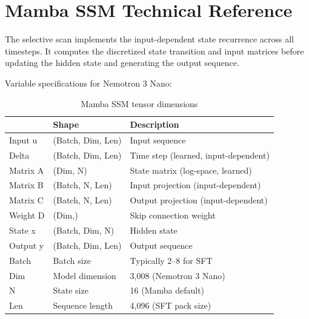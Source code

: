 \section{Mamba SSM Technical Reference}
\label{app:mamba-reference}

The selective scan implements the input-dependent state recurrence 
across all timesteps. It computes the discretized state transition 
and input matrices before updating the hidden state and generating 
the output sequence.

\noindent Variable specifications for Nemotron 3 Nano:

\begin{table}[htbp]
  \centering
  \caption{Mamba SSM tensor dimensions}
  \label{tab:mamba-dims}
  \begin{tabularx}{0.85\textwidth}{lXX}
    \toprule
    \tableheader{Variable & Shape & Description} \\
    \midrule
    Input u     & (Batch, Dim, Len)     & Input sequence \\
    \rowcolor{TableRowOdd}
    Delta       & (Batch, Dim, Len)     & Time step (learned, input-dependent) \\
    Matrix A    & (Dim, N)              & State matrix (log-space, learned) \\
    \rowcolor{TableRowOdd}
    Matrix B    & (Batch, N, Len)       & Input projection (input-dependent) \\
    Matrix C    & (Batch, N, Len)       & Output projection (input-dependent) \\
    \rowcolor{TableRowOdd}
    Weight D    & (Dim,)                & Skip connection weight \\
    State x     & (Batch, Dim, N)       & Hidden state \\
    \rowcolor{TableRowOdd}
    Output y    & (Batch, Dim, Len)     & Output sequence \\
    \midrule
    Batch       & Batch size            & Typically 2--8 for SFT \\
    \rowcolor{TableRowOdd}
    Dim         & Model dimension       & 3,008 (Nemotron 3 Nano) \\
    N           & State size            & 16 (Mamba default) \\
    \rowcolor{TableRowOdd}
    Len         & Sequence length       & 4,096 (SFT pack size) \\
    \bottomrule
  \end{tabularx}
\end{table}

